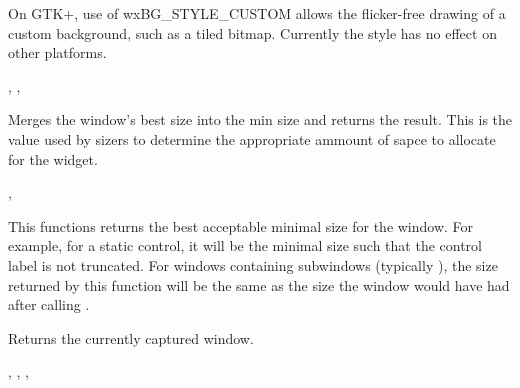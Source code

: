 On GTK+, use of wxBG\_STYLE\_CUSTOM allows the flicker-free drawing of a custom
background, such as a tiled bitmap. Currently the style has no effect on other platforms.


,\rtfsp
{},\rtfsp
{}

\label{wxwindowgeteffectiveminsize}


Merges the window's best size into the min size and returns the
result.  This is the value used by sizers to determine the appropriate
ammount of sapce to allocate for the widget.


,\rtfsp
{}


\label{wxwindowgetbestsize}


This functions returns the best acceptable minimal size for the window. For
example, for a static control, it will be the minimal size such that the
control label is not truncated. For windows containing subwindows (typically
), the size returned by this function will be the
same as the size the window would have had after calling
.


\label{wxwindowgetcapture}


Returns the currently captured window.


,
,
,


\label{wxwindowgetcaret}


